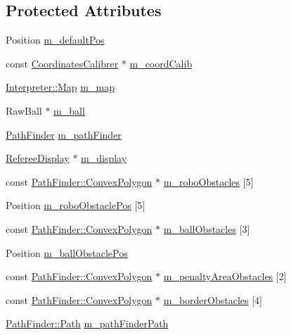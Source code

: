 \subsection*{Protected Attributes}
\begin{DoxyCompactItemize}
\item 
Position \hyperlink{classTeamRobot_a5758854ca2d6a084bea074c39e75b5d3}{m\_\-defaultPos}
\item 
const \hyperlink{classCoordinatesCalibrer}{CoordinatesCalibrer} $\ast$ \hyperlink{classTeamRobot_a3bfcb3cdeedcc11eaed1b5bce532560f}{m\_\-coordCalib}
\item 
\hyperlink{classMatrix}{Interpreter::Map} \hyperlink{classTeamRobot_acf38fcc5b3c4ab4815fb151e39d5889c}{m\_\-map}
\item 
RawBall $\ast$ \hyperlink{classTeamRobot_ac6544ce7a73fe05e3c9a69cc50b58bbe}{m\_\-ball}
\item 
\hyperlink{classPathFinder}{PathFinder} \hyperlink{classTeamRobot_ac5845718f0d540e3f17f39d62d6f11c7}{m\_\-pathFinder}
\item 
\hyperlink{classRefereeDisplay}{RefereeDisplay} $\ast$ \hyperlink{classTeamRobot_aecbb2869966fba9b3de3cbc530c7bc36}{m\_\-display}
\item 
const \hyperlink{structPathFinder_1_1ConvexPolygon}{PathFinder::ConvexPolygon} $\ast$ \hyperlink{classTeamRobot_a9dc410e800f251d62dbde6b3791b2009}{m\_\-roboObstacles} \mbox{[}5\mbox{]}
\item 
Position \hyperlink{classTeamRobot_a5337cff2b594fd63b2445c1d49374d7e}{m\_\-roboObstaclePos} \mbox{[}5\mbox{]}
\item 
const \hyperlink{structPathFinder_1_1ConvexPolygon}{PathFinder::ConvexPolygon} $\ast$ \hyperlink{classTeamRobot_a06fd18a201a66f021e0c72dfd845e26b}{m\_\-ballObstacles} \mbox{[}3\mbox{]}
\item 
Position \hyperlink{classTeamRobot_aba2294985cc9a1dc404271e29166da82}{m\_\-ballObstaclePos}
\item 
const \hyperlink{structPathFinder_1_1ConvexPolygon}{PathFinder::ConvexPolygon} $\ast$ \hyperlink{classTeamRobot_a155fbee5f74459799332801b09c99616}{m\_\-penaltyAreaObstacles} \mbox{[}2\mbox{]}
\item 
const \hyperlink{structPathFinder_1_1ConvexPolygon}{PathFinder::ConvexPolygon} $\ast$ \hyperlink{classTeamRobot_a0292337f910ac2bbb300affb87891ba7}{m\_\-borderObstacles} \mbox{[}4\mbox{]}
\item 
\hyperlink{classPathFinder_a269aba09b7b3208092f67f2bc02cf63e}{PathFinder::Path} \hyperlink{classTeamRobot_aca22e17bd02f1ce84786ed2194764afa}{m\_\-pathFinderPath}

\end{DoxyCompactItemize}
